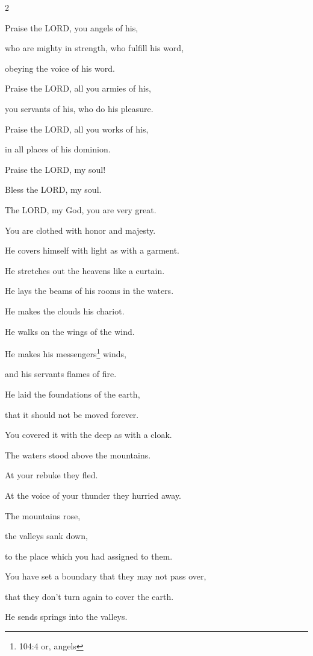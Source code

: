 \begin{multicols}{2}
	
	\myverse{}Praise the LORD, you angels of his,
	
	who are mighty in strength, who fulfill his word,
	
	obeying the voice of his word.
	
	
	\myverse{}Praise the LORD, all you armies of his,
	
	you servants of his, who do his pleasure.
	
	
	\myverse{}Praise the LORD, all you works of his,
	
	in all places of his dominion.
	
	Praise the LORD, my soul!
	
	
	\mychapter{} \myverse*{}Bless the LORD, my soul.
	
	\quad\quad\quad The LORD, my God, you are very great.
	
	You are clothed with honor and majesty.
	
	
	\myverse{}He covers himself with light as with a garment.
	
	He stretches out the heavens like a curtain.
	
	
	\myverse{}He lays the beams of his rooms in the waters.
	
	He makes the clouds his chariot.
	
	He walks on the wings of the wind.
	
	
	\myverse{}He makes his messengers\footnote{104:4 or, angels} winds,
	
	and his servants flames of fire.
	
	
	\myverse{}He laid the foundations of the earth,
	
	that it should not be moved forever.
	
	
	\myverse{}You covered it with the deep as with a cloak.
	
	The waters stood above the mountains.
	
	
	\myverse{}At your rebuke they fled.
	
	At the voice of your thunder they hurried away.
	
	
	\myverse{}The mountains rose,
	
	the valleys sank down,
	
	to the place which you had assigned to them.
	
	
	\myverse{}You have set a boundary that they may not pass over,
	
	that they don’t turn again to cover the earth.
	
	
	\myverse{}He sends springs into the valleys.
	

\end{multicols}
